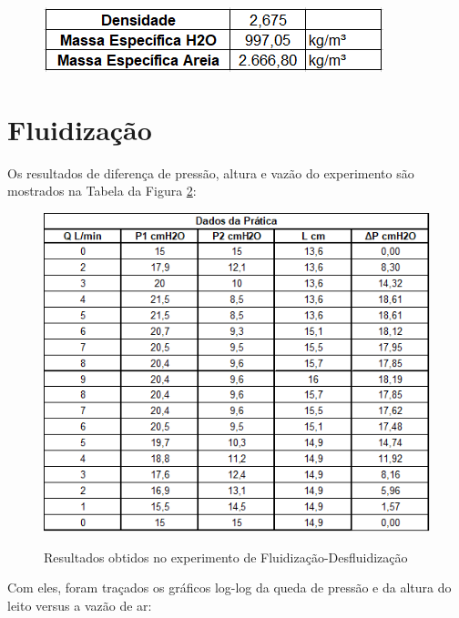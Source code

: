 \begin{figure}[H]
	\begin{center}
		\includegraphics[scale=1, trim={0 0 0 0}]{figuras/ladeq/fluid/fig6}
		\label{fig6}
	\end{center}
\end{figure}

\section{Fluidização}

Os resultados de diferença de pressão, altura e vazão do experimento são mostrados na Tabela da Figura \ref{fig12}:

\begin{figure}[H]
	\begin{center}
		\includegraphics[scale=1, trim={0 0 0 0}]{figuras/ladeq/fluid/fig7}
		\label{fig12}
		\caption{Resultados obtidos no experimento de Fluidização-Desfluidização}
	\end{center}
\end{figure}

Com eles, foram traçados os gráficos log-log da queda de pressão e da altura do leito versus a vazão de ar:


